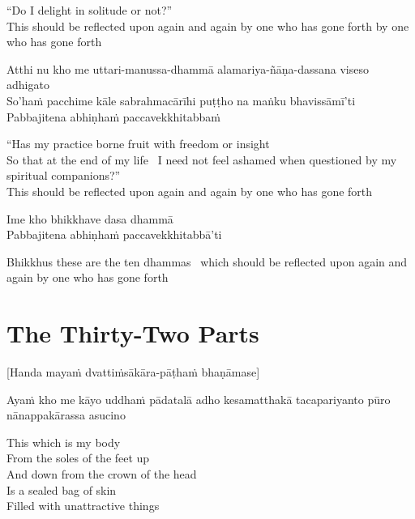 \begin{english}
  “Do I delight in solitude or not?”\\
  This should be reflected upon again and again by one who has gone forth by one who has gone forth
\end{english}

Atthi nu kho me uttari-manussa-dhammā alamariya-ñāṇa-dassana viseso adhigato\\
So’haṁ pacchime kāle sabrahmacārīhi puṭṭho na maṅku bhavissāmī’ti\\
Pabbajitena abhiṇhaṁ paccavekkhitabbaṁ

\begin{english}
  “Has my practice borne fruit with freedom or insight\\
  So that at the end of my life \breathmark\ I need not feel ashamed when questioned by my spiritual companions?”\\
  This should be reflected upon again and again by one who has gone forth
\end{english}

Ime kho bhikkhave dasa dhammā\\
Pabbajitena abhiṇhaṁ paccavekkhitabbā'ti

\begin{english}
  Bhikkhus these are the ten dhammas \breathmark\ which should be reflected upon again and again by one who has gone forth
\end{english}

\suttaRef{[AN 10.48]}

\clearpage

\section{The Thirty-Two Parts}
\label{32-parts}

\begin{center}
  [Handa mayaṁ dvattiṁsākāra-pāṭhaṁ bhaṇāmase]
\end{center}

Ayaṁ kho me kāyo uddhaṁ pādatalā adho kesamatthakā tacapariyanto pūro nānappakārassa asucino

\begin{english}
  This which is my body\\
  From the soles of the feet up\\
  And down from the crown of the head\\
  Is a sealed bag of skin\\
  Filled with unattractive things
\end{english}

